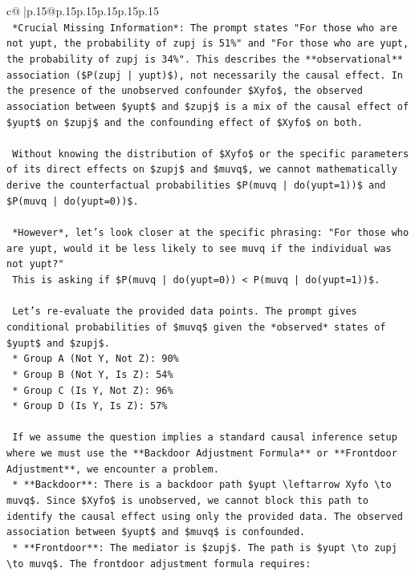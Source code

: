 \documentclass{article}
\begin{document}
{\begin{supertabular}{c@{$\;$}|p{.15\linewidth}@{}p{.15\linewidth}p{.15\linewidth}p{.15\linewidth}p{.15\linewidth}p{.15\linewidth}}
{{{\\ 
\texttt{    *Crucial Missing Information*: The prompt states "For those who are not yupt, the probability of zupj is 51\%" and "For those who are yupt, the probability of zupj is 34\%". This describes the **observational** association (\$P(zupj | yupt)\$), not necessarily the causal effect. In the presence of the unobserved confounder \$Xyfo\$, the observed association between \$yupt\$ and \$zupj\$ is a mix of the causal effect of \$yupt\$ on \$zupj\$ and the confounding effect of \$Xyfo\$ on both.} \\
\\ 
\texttt{    Without knowing the distribution of \$Xyfo\$ or the specific parameters of its direct effects on \$zupj\$ and \$muvq\$, we cannot mathematically derive the counterfactual probabilities \$P(muvq | do(yupt=1))\$ and \$P(muvq | do(yupt=0))\$.} \\
\\ 
\texttt{    *However*, let's look closer at the specific phrasing: "For those who are yupt, would it be less likely to see muvq if the individual was not yupt?"} \\
\texttt{    This is asking if \$P(muvq | do(yupt=0)) < P(muvq | do(yupt=1))\$.} \\
\\ 
\texttt{    Let's re{-}evaluate the provided data points. The prompt gives conditional probabilities of \$muvq\$ given the *observed* states of \$yupt\$ and \$zupj\$.} \\
\texttt{    *   Group A (Not Y, Not Z): 90\%} \\
\texttt{    *   Group B (Not Y, Is Z): 54\%} \\
\texttt{    *   Group C (Is Y, Not Z): 96\%} \\
\texttt{    *   Group D (Is Y, Is Z): 57\%} \\
\\ 
\texttt{    If we assume the question implies a standard causal inference setup where we must use the **Backdoor Adjustment Formula** or **Frontdoor Adjustment**, we encounter a problem.} \\
\texttt{    *   **Backdoor**: There is a backdoor path \$yupt \textbackslash{}leftarrow Xyfo \textbackslash{}to muvq\$. Since \$Xyfo\$ is unobserved, we cannot block this path to identify the causal effect using only the provided data. The observed association between \$yupt\$ and \$muvq\$ is confounded.} \\
\texttt{    *   **Frontdoor**: The mediator is \$zupj\$. The path is \$yupt \textbackslash{}to zupj \textbackslash{}to muvq\$. The frontdoor adjustment formula requires:} \\
}}}
\end{supertabular}}
\end{document}
